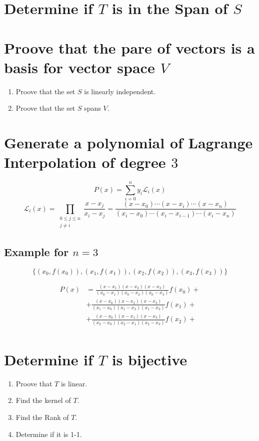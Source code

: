 \documentclass[10pt, oneside]{article}
\begin{document}
\section{Determine if $T$ is in the Span of $S$}

\section{Proove that the pare of vectors is a basis for vector space $V$}

\begin{enumerate}
	\item Proove that the set $S$ is linearly independent.
	\item Proove that the set $S$ spans $V$.
\end{enumerate}

\section{Generate a polynomial of Lagrange Interpolation of degree $3$}
\[
	P(x) = \sum_{i=0}^{n} y_i \mathcal{L}_i(x)
\]
\[
	\mathcal{L}_i(x) =
	\prod_{\substack{0 \leq j \leq n \\ j \neq i}} \frac{x - x_j}{x_i - x_j} =
	\frac{(x-x_0)\cdots(x-x_i)\cdots(x-x_n)}{(x_i-x_0)\cdots(x_i-x_{i-1})\cdots(x_i-x_n)}
\]

\subsection{Example for $n = 3$}

$$ \{(x_0, f(x_0)), (x_1, f(x_1)), (x_2, f(x_2)), (x_3, f(x_3))\} $$

\[
	\begin{split}
		P(x) &= \frac{(x-x_1)(x-x_2)(x-x_3)}{(x_0-x_1)(x_0-x_2)(x_0-x_3)}f(x_0) + \\
		&+ \frac{(x-x_0)(x-x_2)(x-x_3)}{(x_1-x_0)(x_1-x_2)(x_1-x_3)}f(x_1) + \\
		&+ \frac{(x-x_0)(x-x_1)(x-x_3)}{(x_2-x_0)(x_2-x_1)(x_2-x_3)}f(x_2) + \\
	\end{split}
\]

\section{Determine if $T$ is bijective}

\begin{enumerate}
	\item Proove that $T$ is linear.
	\item Find the kernel of $T$.
	\item Find the Rank of $T$.
	\item Determine if it is 1-1.
\end{enumerate}
\end{document}
